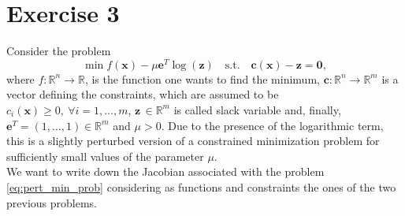 \documentclass[a4paper,11pt]{article}
\newcommand{\R}{\mathbb{R}}
\begin{document}
\section*{Exercise 3}
Consider the problem
\begin{equation}
	\min f(\textbf{x}) - \mu \textbf{e}^{T}\log(\textbf{z}) \quad \text{s.t.} \quad \textbf{c}(\textbf{x})- \textbf{z} = \textbf{0},
	\label{eq:pert_min_prob}
\end{equation}
where $f : \R^{n} \rightarrow \R$, is the function one wants to find the minimum, $\textbf{c} : \R^{n} \rightarrow \R^{m}$ is a vector defining the constraints, which are assumed to be $c_{i}(\textbf{x})\ge0, \ \forall i=1,\dots,m$, $\textbf{z}\, \in \R^{m}$ is called slack variable and, finally, $\textbf{e}^{T}=(1,\dots,1)\in \R^{m}$ and $\mu>0$. Due to the presence of the logarithmic term, this is a slightly perturbed version of a constrained minimization problem for sufficiently small values of the parameter $\mu$.\\

\noindent We want to write down the Jacobian associated with the problem \eqref{eq:pert_min_prob} considering as functions and constraints the ones of the two previous problems.
\end{document}
